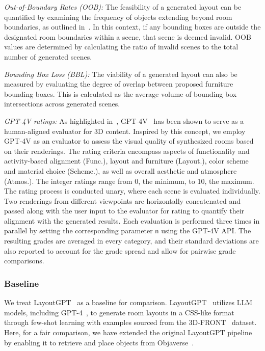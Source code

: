 \documentclass[runningheads]{llncs}
\begin{document}
\noindent
\textit{Out-of-Boundary Rates (OOB): } 
The feasibility of a generated layout can be quantified by examining the frequency of objects extending beyond room boundaries, as outlined in~\cite{feng2023layoutgpt}. In this context, if any bounding boxes are outside the designated room boundaries within a scene, that scene is deemed invalid. OOB values are determined by calculating the ratio of invalid scenes to the total number of generated scenes.

\noindent
\textit{Bounding Box Loss (BBL):} 
The viability of a generated layout can also be measured by evaluating the degree of overlap between proposed furniture bounding boxes. This is calculated as the average volume of bounding box intersections across generated scenes.

\noindent
\textit{GPT-4V ratings:} 
As highlighted in~\cite{wu2024gpt}, GPT-4V~\cite{achiam2023gpt} has been shown to serve as a human-aligned evaluator for 3D content. Inspired by this concept, we employ GPT-4V as an evaluator to assess the visual quality of synthesized rooms based on their renderings. The rating criteria encompass aspects of functionality and activity-based alignment (Func.), layout and furniture (Layout.), color scheme and material choice (Scheme.), as well as overall aesthetic and atmosphere (Atmos.). The integer ratings range from 0, the minimum, to 10, the maximum. The rating process is conducted unary, where each scene is evaluated individually. Two renderings from different viewpoints are horizontally concatenated and passed along with the user input to the evaluator for rating to quantify their alignment with the generated results.
Each evaluation is performed three times in parallel by setting the corresponding parameter \texttt{n} using the GPT-4V API. 
The resulting grades are averaged in every category, and their standard deviations are also reported to account for the grade spread and allow for pairwise grade comparisons.

\subsubsection{Baseline}

We treat LayoutGPT~\cite{feng2023layoutgpt} as a baseline for comparison. LayoutGPT~\cite{feng2023layoutgpt} utilizes LLM models, including GPT-4~\cite{achiam2023gpt}, to generate room layouts in a CSS-like format through few-shot learning with examples sourced from the 3D-FRONT~\cite{fu20213df} dataset. 
Here, for a fair comparison, we have extended the original LayoutGPT pipeline~\cite{feng2023layoutgpt} by enabling it to retrieve and place objects from Objaverse~\cite{deitke2023objaverse}.
\end{document}
